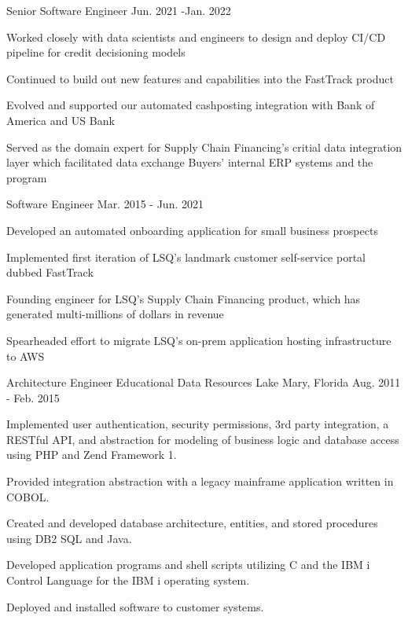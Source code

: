 \begin{cventries}
   \cventry
   {Senior Software Engineer} %
   {} %
   {} %
   {Jun. 2021 -Jan. 2022} %
   {
      \begin{cvitems} %
        \item{Worked closely with data scientists and engineers to design and deploy CI/CD pipeline for credit decisioning models}
        \item{Continued to build out new features and capabilities into the FastTrack product}
        \item{Evolved and supported our automated cashposting integration with Bank of America and US Bank}
        \item{Served as the domain expert for Supply Chain Financing's critial data integration layer which facilitated data exchange Buyers' internal ERP systems and the program}
      \end{cvitems}
   }
   
   \cventry
   {Software Engineer} %
   {} %
   {} %
   {Mar. 2015 - Jun. 2021} %
   {
      \begin{cvitems} %
        \item{Developed an automated onboarding application for small business prospects}
        \item{Implemented first iteration of LSQ's landmark customer self-service portal dubbed FastTrack}
        \item{Founding engineer for LSQ's Supply Chain Financing product, which has generated multi-millions of dollars in revenue}
        \item{Spearheaded effort to migrate LSQ's on-prem application hosting infrastructure to AWS}
      \end{cvitems}
   }

  \cventry
    {Architecture Engineer} %
    {Educational Data Resources} %
    {Lake Mary, Florida} %
    {Aug. 2011 - Feb. 2015} %
    {
      \begin{cvitems} %
        \item{Implemented user authentication, security permissions, 3rd party integration, a RESTful API, and abstraction for modeling of business logic and database access using PHP and Zend Framework 1.}
        \item{Provided integration abstraction with a legacy mainframe application written in COBOL.}
        \item{Created and developed database architecture, entities, and stored procedures using DB2 SQL and Java.}
        \item{Developed application programs and shell scripts utilizing C and the IBM i Control Language for the IBM i operating system.}
        \item{Deployed and installed software to customer systems.}
      \end{cvitems}
    }


\end{cventries}
